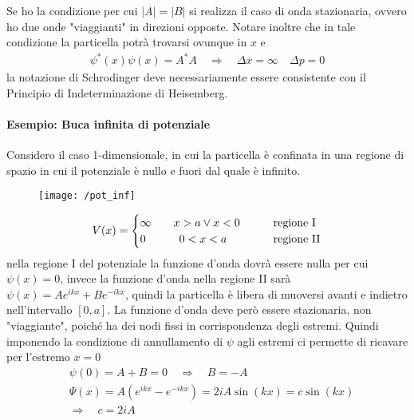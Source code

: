 Se ho la condizione per cui $|A| = |B|$ si realizza il caso di onda stazionaria, ovvero ho due onde "viaggianti" in direzioni opposte.
Notare inoltre che in tale condizione la particella potrà trovarsi ovunque in $x$ e 
\begin{equation}
\begin{split}
\psi^{\ast}(x)\psi (x)= A^{\ast} A \quad\Rightarrow\quad  \Delta x = \infty \quad \Delta p = 0
\end{split}
\end{equation}
la notazione di Schrodinger deve necessariamente essere consistente con il Principio di Indeterminazione di Heisemberg.


\paragraph{Esempio: Buca infinita di potenziale}
Considero il caso 1-dimensionale, in cui la particella è confinata in una regione di spazio in cui il potenziale è nullo e fuori dal quale è infinito.
\begin{figure}[h]
\centering
\texttt{[image: /pot\_inf]}
\end{figure}
\begin{equation}
V(x) = 
\begin{cases}
	\infty \quad\quad x>a \vee x<0 & \quad\quad \mbox{regione \rm{I}} \\
	0 \quad\quad\quad 0 < x < a & \quad\quad \mbox{regione \rm{II}}
\end{cases}
\end{equation}
nella regione \rm{I} del potenziale la funzione d'onda dovrà essere nulla per cui $\psi(x)  = 0$, invece la funzione d'onda nella regione \rm{II} sarà $\psi (x) = A e^{i k x} + B e^{- i k x} $, quindi la particella è libera di muoversi avanti e indietro nell'intervallo $[0, a]$.
La funzione d'onda deve però essere stazionaria, non "viaggiante", poiché ha dei nodi fissi in corrispondenza degli estremi.
Quindi imponendo la condizione di annullamento di $\psi$ agli estremi ci permette di ricavare per l'estremo $x=0$
\begin{equation}
\begin{split}
& \psi(0) = A + B = 0 \quad\Rightarrow\quad  B = - A \\
& \Psi (x) = A ( e^{i k x} - e^{- i k x} ) = 2 i A \sin(k x) = c \sin(k x) \\
& \Rightarrow\quad c = 2 i A
\end{split}
\end{equation}
